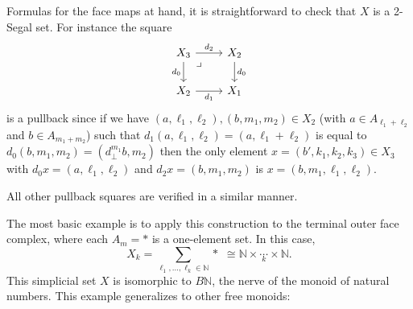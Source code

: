 \documentclass{conm-p-l}
\theoremstyle{definition}
\theoremstyle{remark}
\begin{document}
Formulas for the face maps at hand, it is straightforward to check that $X$ is a 2-Segal set.
For instance the square 
\[ \begin{tikzcd}
X_3 \ar[dr, phantom, "\lrcorner" very near start] \rar{d_2} \dar[swap]{d_0} & X_2 \dar{d_0} \\
X_2 \rar[swap]{d_1} & X_1
\end{tikzcd} \]
is a pullback
since if we have $(a,\ell_1, \ell_2), (b,m_1,m_2) \in X_2$ (with $a\in A_{\ell_1 + \ell_2}$ and $b\in A_{m_1 + m_2}$) such that $d_1(a, \ell_1, \ell_2) = (a, \ell_1 + \ell_2)$ is equal to $d_0(b,m_1, m_2) = (d_\bot^{m_1} b, m_2)$ then the only element $x = (b',k_1, k_2, k_3) \in X_3$ with $d_0 x = (a,\ell_1,\ell_2)$ and $d_2x = (b,m_1,m_2)$ is $x = (b,m_1, \ell_1, \ell_2)$. 

All other pullback squares are verified in a similar manner.

The most basic example is to apply this construction to the terminal outer face complex, where each $A_m = \ast$ is a one-element set.
In this case, \[ X_k = \sum_{\ell_1, \dots, \ell_k \in \mathbb{N}} \ast \,\, \cong \mathbb{N} \times \underset{k}\cdots \times \mathbb{N}.\]
This simplicial set $X$ is isomorphic to $B\mathbb{N}$, the nerve of the monoid of natural numbers.
This example generalizes to other free monoids:
\end{document}
